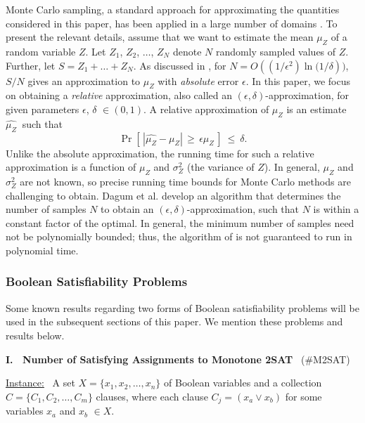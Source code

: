 Monte Carlo sampling, a standard approach for approximating the quantities
considered in this paper, has been applied in a large number of domains
\cite{hammersley64}.  
To present the relevant details, assume that we want to estimate
the mean $\mu_Z$ of a random variable $Z$.
Let $Z_1$, $Z_2$, $\ldots$, $Z_N$ denote $N$ randomly sampled values of $Z$.
Further, let $S=Z_1+\ldots+Z_N$.  
As discussed in \cite{dagum:focs95}, for 
$N = O((1/\epsilon^2)\ln{(1/\delta}))$, $S/N$ gives an approximation to $\mu_Z$
with \emph{absolute} error $\epsilon$. 
In this paper, we focus on 
obtaining a \emph{relative} approximation, also called an
$(\epsilon, \delta)$-approximation, for given parameters 
$\epsilon$, $\delta$  $\in (0,1)$.
A relative approximation of $\mu_Z$ is an estimate $\widehat{\mu_Z}\:$ such that 
\[
\Pr\left[\,|\widehat{\mu_Z}-\mu_Z| \,\geq\, \epsilon\mu_Z\,\right] 
        ~\leq~ \delta.
\]
\noindent
Unlike the absolute approximation, the running time for
such a relative approximation is a function of $\mu_Z$ and $\sigma^2_Z$
(the variance of $Z$). 
In general, 
$\mu_Z$ and $\sigma^2_Z$ are not known, so precise running time bounds
for Monte Carlo methods are challenging to obtain.
Dagum et al. \cite{dagum:focs95} develop an algorithm that
determines the number of samples $N$ to obtain an $(\epsilon, \delta)$-approximation,
such that $N$ is within a constant factor of the optimal. 
In general, the minimum number of samples need not be 
polynomially bounded; thus, the algorithm
of \cite{dagum:focs95} is not guaranteed to run in polynomial time.


\subsubsection{Boolean Satisfiability Problems} 
\label{sss:boolean_sat}

Some known results regarding two forms
of Boolean satisfiability problems 
will be used in the subsequent sections of this paper.
We mention these problems and results below.

\newcommand{\mtsat}{\mbox{\#M2SAT}}
\newcommand{\dnfsat}{\mbox{\#DNFSAT}}

\medskip
\noindent
\textbf{I.~ Number of Satisfying Assignments to Monotone 2SAT}~ (\mtsat)

\medskip
\noindent
\underline{Instance:}~ A set $X = \{x_1, x_2, \ldots, x_n\}$ of
Boolean variables and a collection 
$C = \{C_1, C_2, \ldots, C_m\}$ clauses,
where each clause $C_j = (x_a \vee x_b)$ for some variables $x_a$ and
$x_b$ $\in X$.

